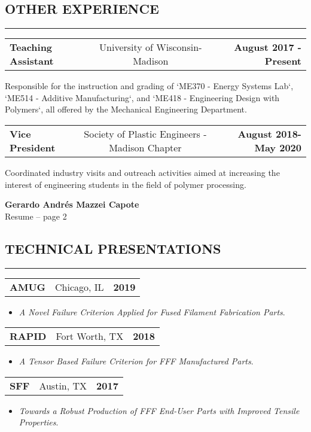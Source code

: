 \documentclass[11pt,letterpaper]{article}
\makeatletter
\newcommand{\headerrow}[3]
{\vspace{0.4em}
\noindent
\begin{tabular*}{\textwidth}{l @{\extracolsep{\fill}} cr}
	\textbf{#1} & %
	#2 &		  %
	\textbf{#3}\\ %
\end{tabular*}}
\makeatother
\begin{document}
\subsection*{OTHER EXPERIENCE}

\vspace{-0.5em}
\hrule
	
	\headerrow
		{Teaching Assistant}
		{University of Wisconsin-Madison} 
		{August 2017 - Present}
		Responsible for the instruction and grading of `ME370 - Energy Systems Lab`, `ME514 - Additive Manufacturing`, and `ME418 - Engineering Design with Polymers`, all offered by the Mechanical Engineering Department. 
	
	\headerrow
		{Vice President}
		{Society of Plastic Engineers - Madison Chapter} 
		{August 2018- May 2020}
		Coordinated industry visits and outreach activities aimed at increasing the interest of engineering students in the field of polymer processing.
	
\pagebreak %
\thispagestyle{empty} %

\begin{center}
	\LARGE \textbf{Gerardo Andrés Mazzei Capote} \\
	\normalsize Resume -- page 2
\end{center}

\subsection*{TECHNICAL PRESENTATIONS}

	\vspace{-0.5em}
	\hrule
	\headerrow
		{AMUG}
		{Chicago, IL}
		{2019}
	\begin{itemize}
		\item \emph{A Novel Failure Criterion Applied for Fused Filament Fabrication Parts}.
	\end{itemize}

	\headerrow
		{RAPID}{Fort Worth, TX}{2018}
	\begin{itemize}
		\item \emph{A Tensor Based Failure Criterion for FFF Manufactured Parts}.
	\end{itemize}

	\headerrow
		{SFF}
		{Austin, TX}
		{2017}
	\begin{itemize}
		\item \emph{Towards a Robust Production of FFF End-User Parts with Improved Tensile Properties}. 
	\end{itemize}
\end{document}
